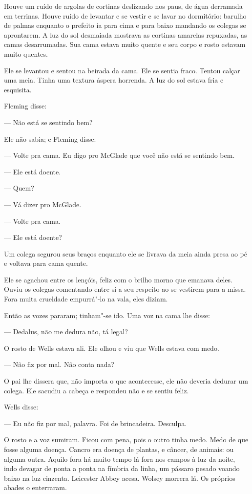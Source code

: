 Houve um ruído de argolas de cortinas deslizando nos paus, de água
derramada em terrinas. Houve ruído de levantar e se vestir e se lavar
no dormitório: barulho de palmas enquanto o prefeito ia para cima e
para baixo mandando os colegas se aprontarem. A luz do sol desmaiada
mostrava as cortinas amarelas repuxadas, as camas desarrumadas. Sua
cama estava muito quente e seu corpo e rosto estavam muito quentes.

Ele se levantou e sentou na beirada da cama. Ele se sentia fraco. Tentou
calçar uma meia. Tinha uma textura áspera horrenda. A luz do sol estava
fria e esquisita.

Fleming disse:

 --- Não está se sentindo bem?

Ele não sabia; e Fleming disse:

 --- Volte pra cama. Eu digo pro McGlade que você não está se sentindo bem.

 --- Ele está doente.

 --- Quem?

 --- Vá dizer pro McGlade.

 --- Volte pra cama.

 --- Ele está doente?

Um colega segurou seus braços enquanto ele se livrava da meia ainda
presa ao pé e voltava para cama quente.

Ele se agachou entre os lençóis, feliz com o brilho morno que emanava
deles. Ouviu os colegas comentando entre si a seu respeito ao se
vestirem para a missa. Fora muita crueldade empurrá"-lo na vala, eles
diziam.

Então as vozes pararam; tinham"-se ido. Uma voz na cama lhe disse:

 --- Dedalus, não me dedura não, tá legal?

O rosto de Wells estava ali. Ele olhou e viu que Wells estava com medo.

 --- Não fiz por mal. Não conta nada?

O pai lhe dissera que, não importa o que acontecesse, ele não deveria
dedurar um colega. Ele sacudiu a cabeça e respondeu não e se sentiu
feliz.

Wells disse:

 --- Eu não fiz por mal, palavra. Foi de brincadeira. Desculpa.

O rosto e a voz sumiram. Ficou com pena, pois o outro tinha medo. Medo
de que fosse alguma doença. Cancro era doença de plantas, e câncer, de
animais: ou alguma outra. Aquilo fora há muito tempo lá fora nos campos
à luz da noite, indo devagar de ponta a ponta na fímbria da linha, um
pássaro pesado voando baixo na luz cinzenta. Leicester Abbey acesa.
Wolsey morrera lá. Os próprios abades o enterraram.

